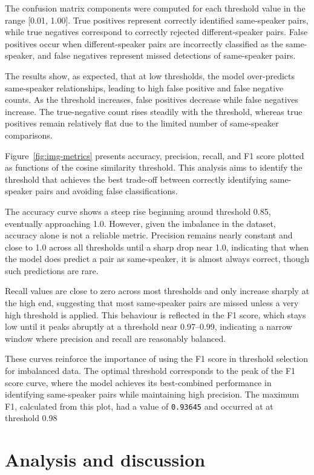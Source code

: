 \documentclass[conference]{IEEEtran}
\begin{document}
	The confusion matrix components were computed for each threshold value in the range [0.01, 1.00]. True positives represent correctly identified same-speaker pairs, while true negatives correspond to correctly rejected different-speaker pairs. False positives occur when different-speaker pairs are incorrectly classified as the same-speaker, and false negatives represent missed detections of same-speaker pairs.
	
	The results show, as expected, that at low thresholds, the model over-predicts same-speaker relationships, leading to high false positive and false negative counts. As the threshold increases, false positives decrease while false negatives increase. The true-negative count rises steadily with the threshold, whereas true positives remain relatively flat due to the limited number of same-speaker comparisons.
	
	Figure~\ref{fig:img-metrics} presents accuracy, precision, recall, and F1 score plotted as functions of the cosine similarity threshold. This analysis aims to identify the threshold that achieves the best trade-off between correctly identifying same-speaker pairs and avoiding false classifications.
	
	The accuracy curve shows a steep rise beginning around threshold 0.85, eventually approaching 1.0. However, given the imbalance in the dataset, accuracy alone is not a reliable metric. Precision remains nearly constant and close to 1.0 across all thresholds until a sharp drop near 1.0, indicating that when the model does predict a pair as same-speaker, it is almost always correct, though such predictions are rare.
	
	Recall values are close to zero across most thresholds and only increase sharply at the high end, suggesting that most same-speaker pairs are missed unless a very high threshold is applied. This behaviour is reflected in the F1 score, which stays low until it peaks abruptly at a threshold near 0.97–0.99, indicating a narrow window where precision and recall are reasonably balanced.
	
	These curves reinforce the importance of using the F1 score in threshold selection for imbalanced data. The optimal threshold corresponds to the peak of the F1 score curve, where the model achieves its best-combined performance in identifying same-speaker pairs while maintaining high precision. The maximum F1, calculated from this plot, had a value of \texttt{0.93645} and occurred at at threshold 0.98
	
	\section{Analysis and discussion}
	
\end{document}
